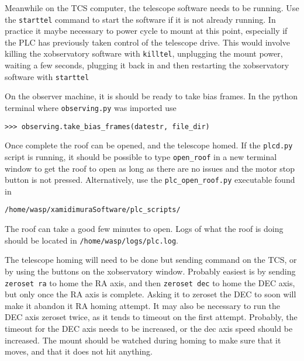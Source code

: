 \documentclass[a4paper,12pt]{article}
\newcommand{\observing}{\tt{observing.py}}
\begin{document}
Meanwhile on the TCS computer, the telescope software needs to be running. Use the {\tt starttel} command to start the software if it is not already running. In practice it maybe necessary to power cycle to mount at this point, especially if the PLC has previously taken control of the telescope drive. This would involve killing the xobservatory software with {\tt killtel}, unplugging the mount power, waiting a few seconds, plugging it back in and then restarting the xobservatory software with {\tt starttel}

On the observer machine, it is should be ready to take bias frames. In the python terminal where {\observing} was imported use
\begin{verbatim}
>>> observing.take_bias_frames(datestr, file_dir)
\end{verbatim}

Once complete the roof can be opened, and the telescope homed. If the {\tt plcd.py} script is running, it should be possible to type {\tt open\_roof} in a new terminal window to get the roof to open as long as there are no issues and the motor stop button is not pressed. Alternatively, use the {\tt plc\_open\_roof.py} executable found in
\begin{verbatim}
/home/wasp/xamidimuraSoftware/plc_scripts/
\end{verbatim}
The roof can take a good few minutes to open. Logs of what the roof is doing should be located in {\tt /home/wasp/logs/plc.log}.

The telescope homing will need to be done but sending command on the TCS, or by using the buttons on the xobservatory window. Probably easiest is by sending {\tt zeroset ra} to home the RA axis, and then {\tt zeroset dec} to home the DEC axis, but only once the RA axis is complete. Asking it to zeroset the DEC to soon will make it abandon it RA homing attempt. It may also be necessary to run the DEC axis zeroset twice, as it tends to timeout on the first attempt. Probably, the timeout for the DEC axis needs to be increased, or the dec axis speed should be increased. The mount should be watched during homing to make sure that it moves, and that it does not hit anything.
\end{document}
